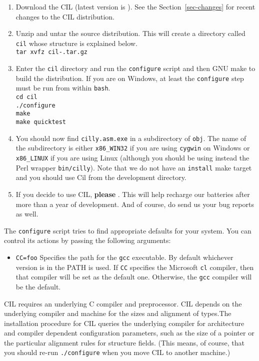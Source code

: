 \documentclass{article}
\def\secref#1{Section~\ref{sec-#1}}
\newcommand{\hsp}{\hspace{0.5in}}
\def\t#1{{\tt #1}}
\begin{document}
\begin{enumerate}
\item Download the CIL  (latest version is
). See the \secref{changes} for recent changes to the CIL distribution.
\item Unzip and untar the source distribution. This will create a directory
      called \t{cil} whose structure is explained below. \\
      \t{tar xvfz cil-\cilversion.tar.gz}
\item Enter the \t{cil} directory and run the \t{configure} script and then 
      GNU make to build the distribution. If you are on Windows, at least the
      \t{configure} step must be run from within \t{bash}. \\
      \hsp\verb!cd cil!\\
      \hsp\verb!./configure!\\
      \hsp\verb!make!\\
      \hsp\verb!make quicktest!\\

\item You should now find \t{cilly.asm.exe} in a
subdirectory of \t{obj}. The name of the subdirectory is either \t{x86\_WIN32}
if you are using \t{cygwin} on Windows or \t{x86\_LINUX} if you are using
Linux (although you should be using instead the Perl wrapper \t{bin/cilly}).
Note that we do not have an \t{install} make target and you should use Cil
from the development directory. 
\item If you decide to use CIL, {\bf please}
. This will help recharge
our batteries after more than a year of development. And of course, do send us
your bug reports as well.

\end{enumerate}

 The \t{configure} script tries to find appropriate defaults for your system.
You can control its actions by passing the following arguments:
\begin{itemize}
\item \t{CC=foo} Specifies the path for the \t{gcc} executable. By default
whichever version is in the PATH is used. If \t{CC} specifies the Microsoft
\t{cl} compiler, then that compiler will be set as the default one. Otherwise,
the \t{gcc} compiler will be the default.
\end{itemize}

 CIL requires an underlying C compiler and preprocessor. CIL depends on the
underlying compiler and machine for the sizes and alignment of types.The
installation procedure for CIL queries the underlying compiler for
architecture and compiler dependent configuration parameters, such as the size
of a pointer or the particular alignment rules for structure fields. (This
means, of course, that you should re-run \t{./configure} when you move CIL to
another machine.)
\end{document}
